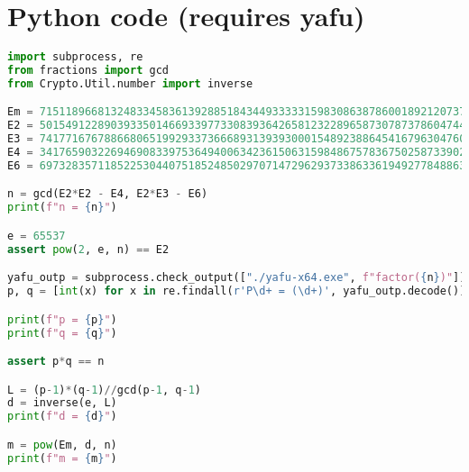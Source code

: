 \documentclass[11pt]{llncs}
\begin{document}
\newpage
\appendix
\section{Python code (requires yafu)}

\scriptsize
\begin{lstlisting}[basicstyle=\ttfamily,language=Python,showstringspaces=false]
import subprocess, re
from fractions import gcd
from Crypto.Util.number import inverse

Em = 71511896681324833458361392885184344933333159830863878600189212073777582178173
E2 = 50154912289039335014669339773308393642658123228965873078737860474494117389068
E3 = 74177167678866806519929337366689313939300015489238864541679630476008627210599
E4 = 34176590322694690833975364940063423615063159848675783675025873390206977645476
E6 = 69732835711852253044075185248502970714729629373386336194927784886349053828079

n = gcd(E2*E2 - E4, E2*E3 - E6)
print(f"n = {n}")

e = 65537
assert pow(2, e, n) == E2

yafu_outp = subprocess.check_output(["./yafu-x64.exe", f"factor({n})"])
p, q = [int(x) for x in re.findall(r'P\d+ = (\d+)', yafu_outp.decode())]

print(f"p = {p}")
print(f"q = {q}")

assert p*q == n

L = (p-1)*(q-1)//gcd(p-1, q-1)
d = inverse(e, L)
print(f"d = {d}")

m = pow(Em, d, n)
print(f"m = {m}")
\end{lstlisting}
\normalsize
\end{document}
